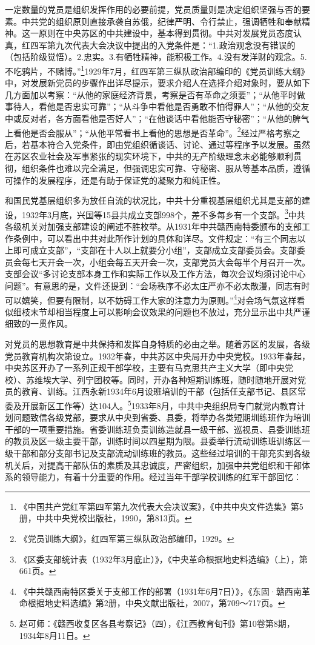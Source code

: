 一定数量的党员是组织发挥作用的必要前提，党员质量则是决定组织坚强与否的要素。中共党的组织原则直接承袭自苏俄，纪律严明、令行禁止，强调牺牲和奉献精神。这一原则在中央苏区的中共建设中，基本得到贯彻。中共对发展党员态度认真，红四军第九次代表大会决议中提出的入党条件是：“1.政治观念没有错误的（包括阶级觉悟）。2.忠实。3.有牺牲精神，能积极工作。4.没有发洋财的观念。5.不吃鸦片，不赌博。”\footnote{《中国共产党红军第四军第九次代表大会决议案》，《中共中央文件选集》第5册，中共中央党校出版社，1990，第813页。}1929年7月，红四军第三纵队政治部编印的《党员训练大纲》中，对发展新党员的步骤作出详尽提示，要求介绍人在选择介绍对象时，要从如下几方面加以考察：“从他的家庭经济背景，考察是否有革命之须要”；“从他平时做事待人，看他是否忠实可靠”；“从斗争中看他是否勇敢不怕得罪人”；“从他的交友中或反对者，各方面看他是否好人”；“在他谈话中看他能否守秘密”；“从他的脾气上看他是否会服从”；“从他平常看书上看他的思想是否革命”。\footnote{《党员训练大纲》，红四军第三纵队政治部编印，1929。}经过严格考察之后，若基本符合入党条件，即由党组织循谈话、讨论、通过等程序予以发展。虽然在苏区农业社会及军事紧张的现实环境下，中共的无产阶级理念未必能够顺利贯彻，组织条件也难以完全满足，但强调忠实可靠、守秘密、服从等基本品质，遵循可操作的发展程序，还是有助于保证党的凝聚力和纯正性。


和国民党基层组织多为放任自流的状况比，中共十分重视基层组织尤其是支部的建设，1932年3月底，兴国等15县共成立支部998个，差不多每乡有一个支部。\footnote{《区委支部统计表（1932年3月底止）》，《中央革命根据地史料选编》（上），第661页。}中共各级机关对加强支部建设的阐述不胜枚举。从1931年中共赣西南特委颁布的支部工作条例中，可以看出中共对此所作计划的具体和详尽。文件规定：“有三个同志以上即可成立支部”，“支部在十人以上就要分小组”，支部成立支部委员会。支部委员会每七天开会一次，小组会每五天开会一次，支部党员大会每半个月召开一次。支部会议“多讨论支部本身工作和实际工作以及工作方法，每次会议均须讨论中心问题”。有意思的是，文件还提到：“会场秩序不必太庄严亦不必太散漫，同志有时可以嬉笑，但要有限制，以不妨碍工作大家的注意力为原则。”\footnote{《中共赣西南特区委关于支部工作的部署（1931年6月7日）》，《东固·赣西南革命根据地史料选编》第2册，中央文献出版社，2007，第709～717页。}对会场气氛这样看似细枝末节却相当程度上可以影响会议效果的问题也不放过，充分显示出中共严谨细致的一贯作风。


对党员的思想教育是中共保持和发挥自身特质的必由之举。随着苏区的发展，各级党员教育机构次第设立。1932年春，中共苏区中央局开办中央党校。1933年春起，中央苏区开办了一系列正规干部学校，主要有马克思共产主义大学（即中央党校）、苏维埃大学、列宁团校等。同时，开办各种短期训练班，随时随地开展对党员的教育、训练。江西永新1934年6月设班培训的干部（包括任支部书记、县区常委及开展新区工作等）达104人。\footnote{赵可师：《赣西收复区各县考察记》（四），《江西教育旬刊》第10卷第8期，1934年8月11日。}1933年8月，中共中央组织局专门就党内教育计划问题致信各级党部，要求从中央到省委、县委，将举办各类短期圳练班作为培训干部的一项重要措施。省委训练班负责训练造就县一级干部、巡视员、县委训练班的教员及区一级主要干部，训练时间以四星期为限。县委举行流动训练班训练区一级干部和部分支部书记及支部流动训练班的教员。这些经过培训的干部充实到各级机关后，对提高干部队伍的素质及其忠诚度，严密组织，加强中共党组织和干部体系的领导能力，有着十分重要的作用。经过当年干部学校训练的红军干部回忆：

